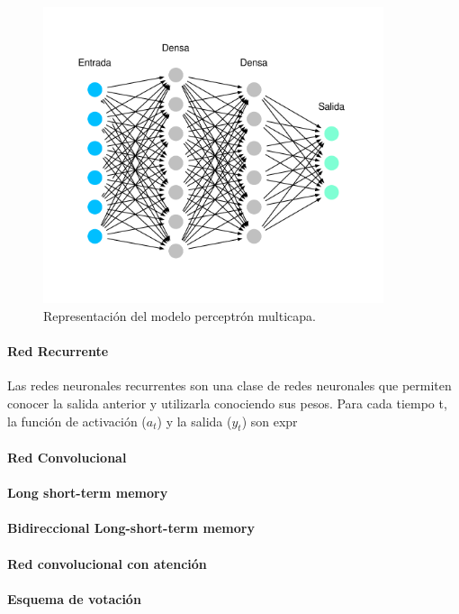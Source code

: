 \begin{figure}[H]
	\centering
	\includegraphics[width=10cm]{Graphics/perceptron.pdf}
	\caption{Representación del modelo perceptrón multicapa\cite{dotnet}.}
	\label{fig:perceptron}
\end{figure}

\paragraph{Red Recurrente}

Las redes neuronales recurrentes son una clase de redes neuronales que permiten conocer la salida anterior y utilizarla conociendo sus pesos. Para cada tiempo t, la función de activación ($a_t$) y la salida ($y_t$) son expr

\paragraph{Red Convolucional}
\paragraph{Long short-term memory}
\paragraph{Bidireccional Long-short-term memory}
\paragraph{Red convolucional con atención}
\paragraph{Esquema de votación}
